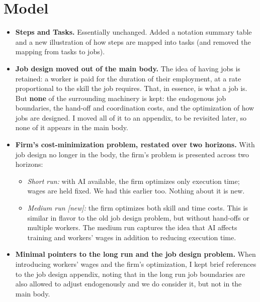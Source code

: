 \documentclass[11pt]{article}
\begin{document}
\section*{Model}
\begin{itemize}
\item \textbf{Steps and Tasks.} Essentially unchanged. Added a notation summary table and a new illustration of how steps are mapped into tasks (and removed the mapping from tasks to jobs).
\item \textbf{Job design moved out of the main body.} The idea of having jobs is retained: a worker is paid for the duration of their employment, at a rate proportional to the skill the job requires. That, in essence, is what a job is. But \textbf{none} of the surrounding machinery is kept: the endogenous job boundaries, the hand-off and coordination costs, and the optimization of how jobs are designed. I moved all of it to an appendix, to be revisited later, so none of it appears in the main body.
\item \textbf{Firm's cost-minimization problem, restated over two horizons.} With job design no longer in the body, the firm's problem is presented across two horizons:
  \begin{itemize}
  \item \emph{Short run:} with AI available, the firm optimizes only execution time; wages are held fixed. We had this earlier too. Nothing about it is new.
  \item \emph{Medium run [new]:} the firm optimizes both skill and time costs. This is similar in flavor to the old job design problem, but without hand-offs or multiple workers. The medium run captures the idea that AI affects training and workers' wages in addition to reducing execution time.
  \end{itemize}
\item \textbf{Minimal pointers to the long run and the job design problem.} When introducing workers' wages and the firm's optimization, I kept brief references to the job design appendix, noting that in the long run job boundaries are also allowed to adjust endogenously and we do consider it, but not in the main body.
\end{itemize}
\end{document}
